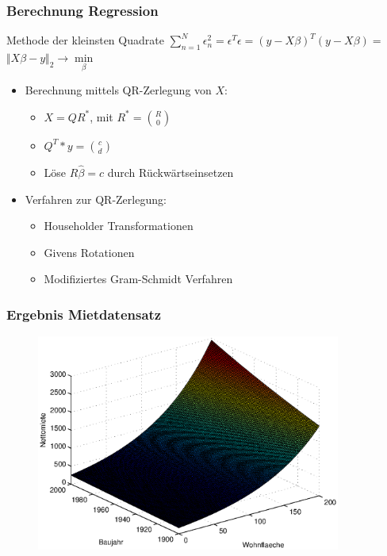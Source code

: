 \documentclass{beamer}
\begin{document}
\begin{frame}
  \frametitle{Berechnung Regression}

  \begin{block}{Methode der kleinsten Quadrate}
    {\centering
      $\sum\limits^{N}_{n=1} \epsilon^2_n = \epsilon^T \epsilon = (y - X \beta)^T (y - X \beta) = $
      $\Vert X\beta - y \Vert_2 \rightarrow \min\limits_{\beta}$
      \\}
  \end{block}
  
  \begin{itemize}
  \item Berechnung mittels QR-Zerlegung von $X$:
    \begin{itemize}
    \item $X = QR^*$, mit $R^* = \binom{R}{0}$
    \item $Q^T * y = \binom{c}{d}$
    \item Löse $R \hat{\beta} = c$ durch Rückwärtseinsetzen
    \end{itemize}
  \end{itemize}

  \pause

  \begin{itemize}
  \item Verfahren zur QR-Zerlegung:
    \begin{itemize}
    \item Householder Transformationen
    \item Givens Rotationen
    \item Modifiziertes Gram-Schmidt Verfahren
    \end{itemize}
  \end{itemize}

\end{frame}

\begin{frame}
  \frametitle{Ergebnis Mietdatensatz}
  
  \begin{figure}[t]
    \centering
    \includegraphics[width=10cm]{figures/nm_wfl_bj_log_approach.eps}
  \end{figure}

\end{frame}
\end{document}
